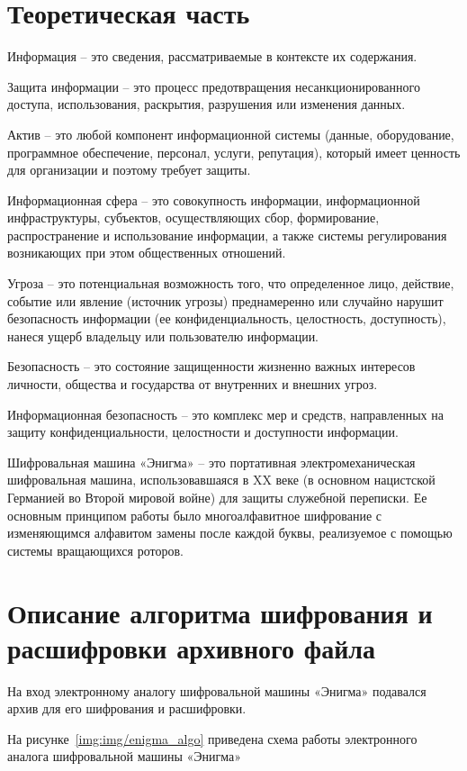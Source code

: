 \chapter{Теоретическая часть}

Информация -- это сведения, рассматриваемые в контексте их содержания.

Защита информации -- это процесс предотвращения несанкционированного доступа, использования, раскрытия, разрушения или изменения данных.

Актив -- это любой компонент информационной системы (данные, оборудование, программное обеспечение, персонал, услуги, репутация), который имеет ценность для организации и поэтому требует защиты.

Информационная сфера -- это совокупность информации, информационной инфраструктуры, субъектов, осуществляющих сбор, формирование, распространение и использование информации, а также системы регулирования возникающих при этом общественных отношений. 

Угроза -- это потенциальная возможность того, что определенное лицо, действие, событие или явление (источник угрозы) преднамеренно или случайно нарушит безопасность информации (ее конфиденциальность, целостность, доступность), нанеся ущерб владельцу или пользователю информации.

Безопасность -- это состояние защищенности жизненно важных интересов личности, общества и государства от внутренних и внешних угроз. 

Информационная безопасность -- это комплекс мер и средств, направленных на защиту конфиденциальности, целостности и доступности информации.

Шифровальная машина «Энигма» -- это портативная электромеханическая шифровальная машина, использовавшаяся в XX веке (в основном нацистской Германией во Второй мировой войне) для защиты служебной переписки. Ее основным принципом работы было многоалфавитное шифрование с изменяющимся алфавитом замены после каждой буквы, реализуемое с помощью системы вращающихся роторов.


\chapter{Описание алгоритма шифрования и расшифровки архивного файла}

На вход электронному аналогу шифровальной машины «Энигма» подавался архив для его шифрования и расшифровки.

На рисунке~\ref{img:img/enigma_algo} приведена схема работы электронного аналога шифровальной машины «Энигма»

